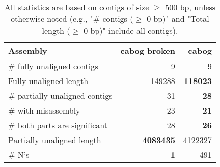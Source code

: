 \documentclass[12pt,a4paper]{article}
\begin{document}
\begin{table}[ht]
\begin{center}
\caption{All statistics are based on contigs of size $\geq$ 500 bp, unless otherwise noted (e.g., "\# contigs ($\geq$ 0 bp)" and "Total length ($\geq$ 0 bp)" include all contigs).}
\begin{tabular}{|l*{2}{|r}|}
\hline
Assembly & cabog broken & cabog \\ \hline
\# fully unaligned contigs & 9 & 9 \\ \hline
Fully unaligned length & 149288 & {\bf 118023} \\ \hline
\# partially unaligned contigs & 31 & {\bf 28} \\ \hline
\hspace{5mm}\# with misassembly & 23 & {\bf 21} \\ \hline
\hspace{5mm}\# both parts are significant & 28 & {\bf 26} \\ \hline
Partially unaligned length & {\bf 4083435} & 4122327 \\ \hline
\# N's & {\bf 1} & 491 \\ \hline
\end{tabular}
\end{center}
\end{table}
\end{document}

